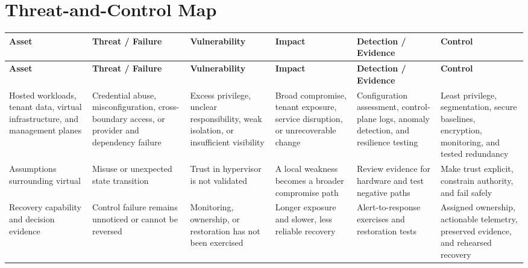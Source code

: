 \documentclass[11pt,letterpaper]{article}
\begin{document}
\section*{Threat-and-Control Map}
\begingroup\scriptsize\setlength{\tabcolsep}{2pt}
\begin{longtable}{>{\raggedright\arraybackslash}p{}>{\raggedright\arraybackslash}p{}>{\raggedright\arraybackslash}p{}>{\raggedright\arraybackslash}p{}>{\raggedright\arraybackslash}p{}>{\raggedright\arraybackslash}p{}}
\toprule\rowcolor{Navy}\color{white}\textbf{Asset} & \color{white}\textbf{Threat / Failure} & \color{white}\textbf{Vulnerability} & \color{white}\textbf{Impact} & \color{white}\textbf{Detection / Evidence} & \color{white}\textbf{Control}\\\midrule
\endfirsthead
\toprule\rowcolor{Navy}\color{white}\textbf{Asset} & \color{white}\textbf{Threat / Failure} & \color{white}\textbf{Vulnerability} & \color{white}\textbf{Impact} & \color{white}\textbf{Detection / Evidence} & \color{white}\textbf{Control}\\\midrule
\endhead
Hosted workloads, tenant data, virtual infrastructure, and management planes & Credential abuse, misconfiguration, cross-boundary access, or provider and dependency failure & Excess privilege, unclear responsibility, weak isolation, or insufficient visibility & Broad compromise, tenant exposure, service disruption, or unrecoverable change & Configuration assessment, control-plane logs, anomaly detection, and resilience testing & Least privilege, segmentation, secure baselines, encryption, monitoring, and tested redundancy\\\midrule
Assumptions surrounding virtual & Misuse or unexpected state transition & Trust in hypervisor is not validated & A local weakness becomes a broader compromise path & Review evidence for hardware and test negative paths & Make trust explicit, constrain authority, and fail safely\\\midrule
Recovery capability and decision evidence & Control failure remains unnoticed or cannot be reversed & Monitoring, ownership, or restoration has not been exercised & Longer exposure and slower, less reliable recovery & Alert-to-response exercises and restoration tests & Assigned ownership, actionable telemetry, preserved evidence, and rehearsed recovery\\\midrule
\bottomrule
\end{longtable}
\endgroup
\end{document}
